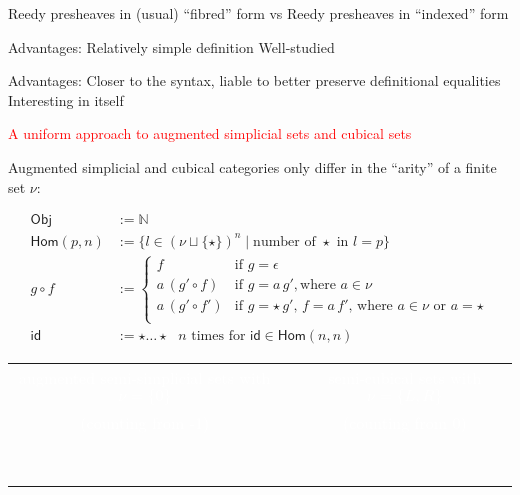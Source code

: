 \documentclass[12pt,landscape]{article}
\begin{document}
\begin{LARGE}
\begin{sf}
\bigskip
Reedy presheaves in (usual) ``fibred'' form vs Reedy presheaves in ``indexed'' form

Advantages:
Relatively simple definition
Well-studied

Advantages:
Closer to the syntax, liable to better preserve definitional equalities
Interesting in itself
\fi

\newcommand{\Obj}{\ensuremath{\mathsf{Obj}}}
\newcommand{\Hom}{\ensuremath{\mathsf{Hom}}}
\newcommand{\id}{\ensuremath{\mathsf{id}}}

\newpage

\begin{center}
\textcolor{red}{\huge A uniform approach to augmented simplicial sets and cubical sets}
\end{center}


\medskip

Augmented simplicial and cubical categories only differ in the
``arity'' of a finite set $\nu$:

$$
  \begin{array}{ll}
    \Obj       & := \mathbb{N}\\
    \Hom(p, n) & := \{l \in (\nu \sqcup \{\star\})^n \mid \text{number of $\star$ in $l = p$}\} \\
    g \circ f             & :=
    \begin{cases}
      f                & \text{if $g = \epsilon$}                                                   \\
      a\,(g' \circ f)  & \text{if $g = a\,g'$}, \text{where $a \in \nu$}                            \\
      a\,(g' \circ f') & \text{if $g = \star\,g'$, $f = a\,f'$, where $a \in \nu$ or $a = \star$} \\
    \end{cases}            \\
    \id                   & := \star \ldots \star \text{ $n$ times for $\id \in \Hom(n, n)$}
  \end{array}
$$

\medskip
\begin{center}
\begin{tabular}{ccc}
\textcolor{white}{augmented semi-simplicial sets with $\nu = \{0\}$} & &
\textcolor{white}{semi-cubical sets with $\nu = \{L,R\}$}\\
\textcolor{white}{(counting from -1)} & &\textcolor{white}{(counting from 0)}\\[-5mm]
\\
\\
\\
\\
\\
\\
\\
\\
\end{tabular}
\end{center}


\end{sf}
\end{LARGE}
\end{document}

